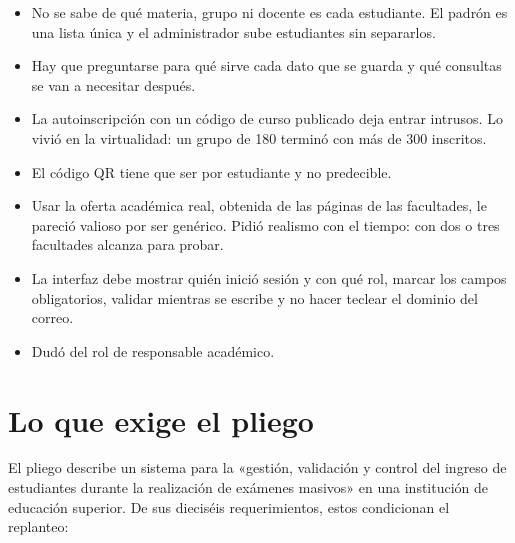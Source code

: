 \documentclass[11pt,letterpaper]{article}
\begin{document}
\begin{itemize}
  \item No se sabe de qué materia, grupo ni docente es cada estudiante. El padrón es una
        lista única y el administrador sube estudiantes sin separarlos.
  \item Hay que preguntarse para qué sirve cada dato que se guarda y qué consultas se
        van a necesitar después.
  \item La autoinscripción con un código de curso publicado deja entrar intrusos. Lo
        vivió en la virtualidad: un grupo de 180 terminó con más de 300 inscritos.
  \item El código QR tiene que ser por estudiante y no predecible.
  \item Usar la oferta académica real, obtenida de las páginas de las facultades, le
        pareció valioso por ser genérico. Pidió realismo con el tiempo: con dos o tres
        facultades alcanza para probar.
  \item La interfaz debe mostrar quién inició sesión y con qué rol, marcar los campos
        obligatorios, validar mientras se escribe y no hacer teclear el dominio del correo.
  \item Dudó del rol de responsable académico.
\end{itemize}

\section{Lo que exige el pliego}

El pliego describe un sistema para la «gestión, validación y control del ingreso de
estudiantes durante la realización de exámenes masivos» en una institución de educación
superior. De sus dieciséis requerimientos, estos condicionan el replanteo:
\end{document}

